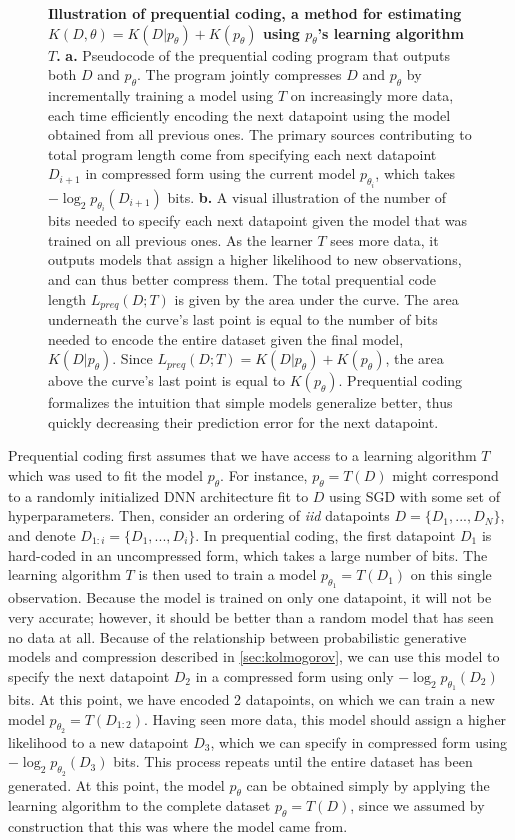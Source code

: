 \documentclass{article}
\begin{document}
\begin{appendices}
\begin{figure}[ht]
    \caption{\textbf{Illustration of prequential coding, a method for estimating $K(D, \theta) = K(D|p_\theta) + K(p_\theta)$ using $p_\theta$'s learning algorithm $T$.} \textbf{a.} Pseudocode of the prequential coding program that outputs both $D$ and $p_\theta$. The program jointly compresses $D$ and $p_\theta$ by incrementally training a model using $T$ on increasingly more data, each time efficiently encoding the next datapoint using the model obtained from all previous ones. The primary sources contributing to total program length come from specifying each next datapoint $D_{i+1}$ in compressed form using the current model $p_{\theta_i}$, which takes $-\log_2 p_{\theta_i}(D_{i+1})$ bits. \textbf{b.} A visual illustration of the number of bits needed to specify each next datapoint given the model that was trained on all previous ones. As the learner $T$ sees more data, it outputs models that assign a higher likelihood to new observations, and can thus better compress them. The total prequential code length $L_{preq}(D; T)$ is given by the area under the curve. The area underneath the curve's last point is equal to the number of bits needed to encode the entire dataset given the final model, $K(D|p_\theta)$. Since $L_{preq}(D; T) = K(D|p_\theta) + K(p_\theta)$, the area above the curve's last point is equal to $K(p_\theta)$. Prequential coding formalizes the intuition that simple models generalize better, thus quickly decreasing their prediction error for the next datapoint.}
    \label{fig:prequential_coding}
\end{figure}

Prequential coding first assumes that we have access to a learning algorithm $T$ which was used to fit the model $p_\theta$. For instance, $p_\theta = T(D)$ might correspond to a randomly initialized DNN architecture fit to $D$ using SGD with some set of hyperparameters. Then, consider an ordering of \textit{iid} datapoints $D = \{D_1, ..., D_N\}$, and denote $D_{1:i} = \{D_1, ..., D_i\}$. In prequential coding, the first datapoint $D_1$ is hard-coded in an uncompressed form, which takes a large number of bits. The learning algorithm $T$ is then used to train a model $p_{\theta_1} = T(D_1)$ on this single observation. Because the model is trained on only one datapoint, it will not be very accurate; however, it should be better than a random model that has seen no data at all. Because of the relationship between probabilistic generative models and compression described in \cref{sec:kolmogorov}, we can use this model to specify the next datapoint $D_2$ in a compressed form using only $-\log_2 p_{\theta_1}(D_2)$ bits. At this point, we have encoded 2 datapoints, on which we can train a new model $p_{\theta_2} = T(D_{1:2})$. Having seen more data, this model should assign a higher likelihood to a new datapoint $D_3$, which we can specify in compressed form using $-\log_2 p_{\theta_2}(D_3)$ bits. This process repeats until the entire dataset has been generated. At this point, the model $p_\theta$ can be obtained simply by applying the learning algorithm to the complete dataset $p_\theta = T(D)$, since we assumed by construction that this was where the model came from.


\end{appendices}
\end{document}
